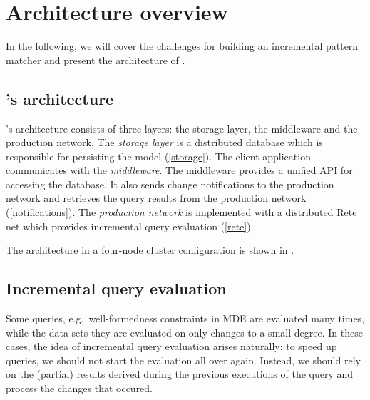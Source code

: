 \section{Architecture overview}
\label{sec:architecture}

In the following, we will cover the challenges for building an incremental pattern matcher and present the architecture of \iqd{}.


\subsection{\iqd{}'s architecture}

\iqd{}'s architecture consists of three layers: the storage layer, the middleware and the production network. 
The \emph{storage layer} is a distributed database which is responsible for persisting the model (\autoref{storage}). 
The client application communicates with the \emph{middleware}. The middleware provides a unified API for accessing the database. It also sends change notifications to the production network and retrieves the query results from the production network (\autoref{notifications}). 
The \emph{production network} is implemented with a distributed Rete net which provides incremental query evaluation (\autoref{rete}).


The \iqd{} architecture in a four-node cluster configuration is shown in .


\subsection{Incremental query evaluation}
\label{rete}

Some queries, e.g.\ well-formedness constraints in MDE are evaluated many times, while the data sets they are evaluated on only changes to a small degree. In these cases, the idea of incremental query evaluation arises naturally: to speed up queries, we should not start the evaluation all over again. Instead, we should rely on the (partial) results derived during the previous executions of the query and process the changes that occured.
 
